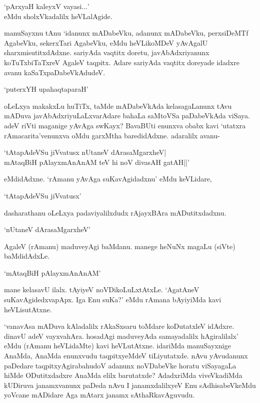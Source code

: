 \begin{shloka}
`pArxyaH kaleyxV vayasi$\ldots$'\\
eMdu sholxVkadalilx heVLalAgide.
\end{shloka}

manuSayxnu tAnu `idanunx mADabeVku, adanunx mADabeVku, perxsiDeMTf AgabeVku, sekerxTari AgabeVku, eMdu heVLikoMDeV yAvAgalU sharxmisutitxdAdxne. sariyAda vaqtitx doretu, javAbAdxriyanunx koTuTxbiTaTxreV AgaleV taqpitx. Adare sariyAda vaqtitx doreyade idadxre avanu kaSaTxpaDabeVkAdudeV.

\begin{shloka}
`puterxYH upahaqtaparaH'
\end{shloka}

oLeLxya makakxLu huTiTx, taMde mADabeVkAda kelasagaLanunx tAvu mADuva javAbAdxriyuLaLxvarAdare bahaLa saMtoVSa paDabeVkAda viSaya. adeV riVti maganige yAvAga swKayx? BavaBUti enunxva obabx kavi `utatxra rAmacarita'venunxva oMdu garxMtha baredidAdxne. adaralilx avanu-

\begin{shloka}
`tAtapAdeVSu jiVvatusx nUtaneV dArasaMgarxheV|\\
mAtaqBiH pAlayxmAnAnAM teV hi noV divasAH gatAH||'
\end{shloka} 

eMdidAdxne. `rAmanu yAvAga suKavAgidadxnu' eMdu keVLidare,

\begin{shloka}
`tAtapAdeVSu jiVvatusx'
\end{shloka}

dasharathanu oLeLxya padaviyalilxdudx rAjayxBAra mADutitxdadxnu.

\begin{shloka}
`nUtaneV dArasaMgarxheV'
\end{shloka}

AgaleV (rAmanu) maduveyAgi baMdanu. manege heNuNx magaLu (siVte) baMdidAdxLe.

\begin{shloka}
`mAtaqBiH pAlayxmAnAnAM'
\end{shloka}

mane kelasavU ilalx. tAyiyeV noVDikoLuLxtAtxLe. `AgatAneV suKavAgidedxvapApx. Iga Enu suKa?' eMdu rAmana bAyiyiMda kavi heVLisutAtxne.

`vanavAsa mADuva kAladalilx rAkaSxsaru toMdare koDutatxleV idAdxre. dinavU adeV vayxvahAra. hosadAgi maduveyAda samayadalilx hAgiralilalx' eMdu (rAmanu heVLidaMte) kavi heVLutAtxne. idariMda manuSayxnige AnaMda, AnaMda enunxvudu taqpitxyeMdeV tiLiyutatxde. nAvu yAvudanunx paDedare taqpitxyAgirabahudoV adanunx noVDabeVke horatu viSayagaLa hiMde ODutitxdadxre AnaMda elilx barutatxde? AdadxriMda viveVkadiMda kUDiruva janamxvanunx paDeda nAvu I janamxdalilxyeV Enu sAdhisabeVkeMdu yoVcane mADidare Aga mAtarx janamx sAthaRkavAguvudu.


\endchapter
